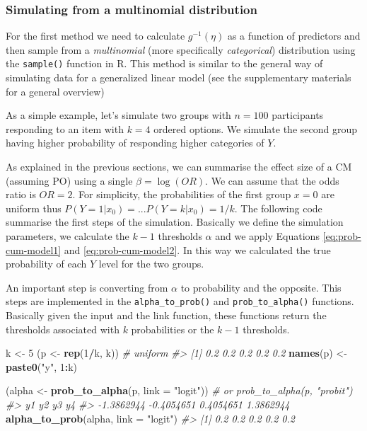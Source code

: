 \documentclass[
  man,floatsintext]{apa6}
\newenvironment{Shaded}{\begin{snugshade}}{\end{snugshade}}
\newcommand{\AttributeTok}[1]{\textcolor[rgb]{0.13,0.29,0.53}{#1}}
\newcommand{\CommentTok}[1]{\textcolor[rgb]{0.56,0.35,0.01}{\textit{#1}}}
\newcommand{\DecValTok}[1]{\textcolor[rgb]{0.00,0.00,0.81}{#1}}
\newcommand{\FunctionTok}[1]{\textcolor[rgb]{0.13,0.29,0.53}{\textbf{#1}}}
\newcommand{\NormalTok}[1]{#1}
\newcommand{\OtherTok}[1]{\textcolor[rgb]{0.56,0.35,0.01}{#1}}
\newcommand{\SpecialCharTok}[1]{\textcolor[rgb]{0.81,0.36,0.00}{\textbf{#1}}}
\newcommand{\StringTok}[1]{\textcolor[rgb]{0.31,0.60,0.02}{#1}}
\begin{document}
\subsubsection{Simulating from a multinomial distribution}\label{simulating-from-a-multinomial-distribution}

For the first method we need to calculate \(g^{-1}(\eta)\) as a function of predictors and then sample from a \emph{multinomial} (more specifically \emph{categorical}) distribution using the \texttt{sample()} function in R. This method is similar to the general way of simulating data for a generalized linear model (see the supplementary materials for a general overview)

As a simple example, let's simulate two groups with \(n = 100\) participants responding to an item with \(k = 4\) ordered options. We simulate the second group having higher probability of responding higher categories of \(Y\).

As explained in the previous sections, we can summarise the effect size of a CM (assuming PO) using a single \(\beta = \log(OR)\). We can assume that the odds ratio is \(OR = 2\). For simplicity, the probabilities of the first group \(x = 0\) are uniform thus \(P(Y = 1|x_0) = ... P(Y = k|x_0) = 1/k\). The following code summarise the first steps of the simulation. Basically we define the simulation parameters, we calculate the \(k - 1\) thresholds \(\alpha\) and we apply Equations \eqref{eq:prob-cum-model1} and \eqref{eq:prob-cum-model2}. In this way we calculated the true probability of each \(Y\) level for the two groups.

An important step is converting from \(\alpha\) to probability and the opposite. This steps are implemented in the \texttt{alpha\_to\_prob()} and \texttt{prob\_to\_alpha()} functions. Basically given the input and the link function, these functions return the thresholds associated with \(k\) probabilities or the \(k - 1\) thresholds.

\scriptsize

\begin{Shaded}
\begin{Highlighting}[]
\NormalTok{k }\OtherTok{\textless{}{-}} \DecValTok{5}
\NormalTok{(p }\OtherTok{\textless{}{-}} \FunctionTok{rep}\NormalTok{(}\DecValTok{1}\SpecialCharTok{/}\NormalTok{k, k)) }\CommentTok{\# uniform}
\CommentTok{\#\textgreater{} [1] 0.2 0.2 0.2 0.2 0.2}
\FunctionTok{names}\NormalTok{(p) }\OtherTok{\textless{}{-}} \FunctionTok{paste0}\NormalTok{(}\StringTok{"y"}\NormalTok{, }\DecValTok{1}\SpecialCharTok{:}\NormalTok{k)}

\NormalTok{(alpha }\OtherTok{\textless{}{-}} \FunctionTok{prob\_to\_alpha}\NormalTok{(p, }\AttributeTok{link =} \StringTok{"logit"}\NormalTok{)) }\CommentTok{\# or prob\_to\_alpha(p, "probit")}
\CommentTok{\#\textgreater{}         y1         y2         y3         y4 }
\CommentTok{\#\textgreater{} {-}1.3862944 {-}0.4054651  0.4054651  1.3862944}
\FunctionTok{alpha\_to\_prob}\NormalTok{(alpha, }\AttributeTok{link =} \StringTok{"logit"}\NormalTok{)}
\CommentTok{\#\textgreater{} [1] 0.2 0.2 0.2 0.2 0.2}
\end{Highlighting}
\end{Shaded}
\end{document}
